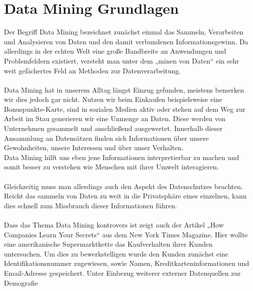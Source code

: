 %


%
%
\chapter{Data Mining Grundlagen}
\label{sec:intro}


Der Begriff Data Mining bezeichnet zunächst einmal das Sammeln, Verarbeiten und
Analysieren von Daten und den damit verbundenen Informationsgewinn. Da
allerdings in der echten Welt eine große Bandbreite an Anwendungen und
Problemfeldern existiert, versteht man unter dem „minen von Daten“ ein sehr
weit gefächertes Feld an Methoden zur Datenverarbeitung. \\
\\
Data Mining hat in unserem Alltag längst Einzug gefunden, meistens bemerken wir
dies jedoch gar nicht. Nutzen wir beim Einkaufen beispielsweise eine
Bonuspunkte-Karte, sind in sozialen Medien aktiv oder stehen auf dem Weg zur
Arbeit im Stau generieren wir eine Unmenge an Daten. Diese werden von
Unternehmen gesammelt und anschließend ausgewertet. Innerhalb dieser Ansammlung
an Datensätzen finden sich Informationen über unsere Gewohnheiten, unsere
Interessen und über unser Verhalten. \\
Data Mining hilft uns eben jene Informationen interpretierbar zu machen und
somit besser zu verstehen wie Menschen mit ihrer Umwelt interagieren. \\
\\
Gleichzeitig muss man allerdings auch den Aspekt des Datenschutzes beachten.
Reicht das sammeln von Daten zu weit in die Privatsphäre eines einzelnen,
kann dies schnell zum Missbrauch dieser Informationen führen. \\
\\
Dass das Thema Data Mining kontrovers ist zeigt auch der Artikel „How
Companies Learn Your Secrets“ aus dem New York Times Magazine. \cite{NYT:12} Hier wollte
eine amerikanische Supermarktkette das Kaufverhalten ihrer Kunden untersuchen.
Um dies zu bewerkstelligen wurde den Kunden zunächst eine Identifikationsnummer
zugewiesen, sowie Namen, Kreditkarteninformationen und Email-Adresse
gespeichert. Unter Einbezug weiterer externer Datenquellen zur Demografie
